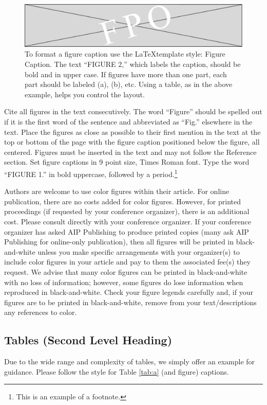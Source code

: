 \documentclass{aip-cp}
\begin{document}
\begin{figure}
  \centerline{\includegraphics[width=500pt]{FIGURES-TMP/fig_2}}
  \caption{To format a figure caption use the \LaTeX template style: Figure Caption. The text ``FIGURE 2,'' which labels the caption, should be bold and in upper case. If figures have more than one part, each part should be labeled (a), (b), etc. Using a table, as in the above example, helps you control the layout.}
\end{figure}

Cite all figures in the text consecutively. The word ``Figure'' should be spelled out if it is the first word of the sentence and abbreviated as ``Fig.'' elsewhere in the text. Place the figures as close as possible to their first mention in the text at the top or bottom of the page with the figure caption positioned below the figure, all centered. Figures must be inserted in the text and may not follow the Reference section. Set figure captions in 9 point size, Times Roman font. Type the word ``FIGURE 1.'' in bold uppercase, followed by a period.\footnote{This is an example of a footnote.}


Authors are welcome to use color figures within their article. For online publication, there are no costs added for color figures. However, for printed proceedings (if requested by your conference organizer), there is an additional cost. Please consult directly with your conference organizer. If your conference organizer has asked AIP Publishing to produce printed copies (many ask AIP Publishing for online-only publication), then all figures will be printed in black-and-white unless you make specific arrangements with your organizer(s) to include color figures in your article and pay to them the associated fee(s) they request. We advise that many color figures can be printed in black-and-white with no loss of information; however, some figures do lose information when reproduced in black-and-white. Check your figure legends carefully and, if your figures are to be printed in black-and-white, remove from your text/descriptions any references to color.


\subsection{Tables (Second Level Heading)}
Due to the wide range and complexity of tables, we simply offer an example for guidance. Please follow the style for Table \ref{tab:a} (and figure) captions.
\end{document}
